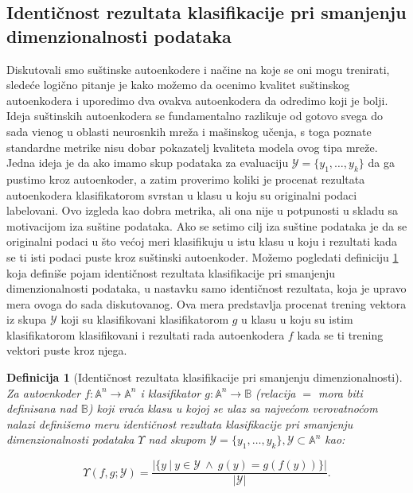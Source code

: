 \documentclass{article}
\newtheorem{definition}{Definicija}
\begin{document}
	\subsection{Identi\v cnost rezultata klasifikacije pri smanjenju dimenzionalnosti podataka}
	
	Diskutovali smo su\v stinske autoenkodere i na\v cine na koje se oni mogu trenirati, slede\'ce logi\v cno pitanje je kako mo\v zemo da ocenimo kvalitet su\v stinskog autoenkodera i uporedimo dva ovakva autoenkodera da odredimo koji je bolji.
	Ideja su\v stinskih autoenkodera se fundamentalno razlikuje od gotovo svega do sada vi\dj enog u oblasti neurosnkih mre\v za i ma\v sinskog u\v cenja, s toga poznate standardne metrike nisu dobar pokazatelj kvaliteta modela ovog tipa mre\v ze.
	Jedna ideja je da ako imamo skup podataka za evaluaciju $\mathcal{Y} = \{y_1, \dots, y_k\}$ da ga pustimo kroz autoenkoder, a zatim proverimo koliki je procenat rezultata autoenkodera klasifikatorom svrstan u klasu u koju su originalni podaci labelovani.
	Ovo izgleda kao dobra metrika, ali ona nije u potpunosti u skladu sa motivacijom iza su\v stine podataka.
	Ako se setimo cilj iza su\v stine podataka je da se originalni podaci u \v sto ve\'coj meri klasifikuju u istu klasu u koju i rezultati kada se ti isti podaci puste kroz su\v stinski autoenkoder.
	Mo\v zemo pogledati definiciju \ref{identicality-of-results-of-classification-upon-dimensionality-reduction} koja defini\v se pojam identi\v cnost rezultata klasifikacije pri smanjenju dimenzionalnosti podataka, u nastavku samo identi\v cnost rezultata, koja je upravo mera ovoga do sada diskutovanog. 
	Ova mera predstavlja procenat trening vektora iz skupa $\mathcal{Y}$ koji su klasifikovani klasifikatorom $g$ u klasu u koju su istim klasifikatorom klasifikovani i rezultati rada autoenkodera $f$ kada se ti trening vektori puste kroz njega.
	
	\begin{definition}[Identi\v cnost rezultata klasifikacije pri smanjenju dimenzionalnosti]
		\label{identicality-of-results-of-classification-upon-dimensionality-reduction}
		\sloppy Za autoenkoder $f : \mathbb{A}^n \to \mathbb{A}^n$ i klasifikator $g : \mathbb{A}^n \to \mathbb{B}$ (relacija $=$ mora biti definisana nad $\mathbb{B}$) koji vra\'ca klasu u kojoj se ulaz sa najve\'com verovatno\'com nalazi defini\v semo meru \emph{identi\v cnost rezultata klasifikacije pri smanjenju dimenzionalnosti podataka $\Upsilon$ nad skupom $\mathcal{Y} = \{y_1, \dots, y_k\}, \mathcal {Y} \subset \mathbb{A}^n$} kao:
		
		$$
		\Upsilon (f, g; \mathcal{Y}) = \frac{\left| \{y ~|~ y \in \mathcal{Y}~ \wedge~ g(y) = g(f(y))\}\right|}{\left| \mathcal{Y} \right|}.
		$$
	\end{definition}
\end{document}
